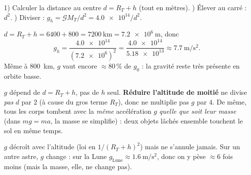 \documentclass[11pt,a4paper]{article}
\begin{document}
\begin{methode}
1) Calculer la distance au centre $d=R_T+h$ (tout en mètres). ) Élever au carré : $d^2$. ) Diviser : $g_h=\mathcal{G}M_T/d^2=\num{4.0e14}/d^2$.
\end{methode}

\begin{exemplebox}[à $h=\qty{800}{\kilo\metre}$]
$d=R_T+h=6400+800=\qty{7200}{\kilo\metre}=\qty{7.2e6}{\metre}$, donc
\[
g_h=\frac{\num{4.0e14}}{(\num{7.2e6})^2}=\frac{\num{4.0e14}}{\num{5.18e13}}
\approx\qty{7.7}{\metre\per\second\squared}.
\]
Même à \qty{800}{\kilo\metre}, $g$ vaut encore $\approx 80\,\%$ de $g_0$ : la gravité
reste très présente en orbite basse.
\end{exemplebox}

\begin{piege}
$g$ dépend de $d=R_T+h$, pas de $h$ seul. \textbf{Réduire l'altitude de moitié} ne
divise \emph{pas} $d$ par $2$ (à cause du gros terme $R_T$), donc ne multiplie pas $g$
par $4$. De même, tous les corps tombent avec la \emph{même} accélération $g$
\emph{quelle que soit leur masse} (dans $mg=ma$, la masse se simplifie) : deux objets
lâchés ensemble touchent le sol en même temps.
\end{piege}

\begin{remarque}
$g$ décroît avec l'altitude (loi en $1/(R_T+h)^2$) mais ne s'annule jamais. Sur un
autre astre, $g$ change : sur la Lune $g_{\text{Lune}}\approx\qty{1.6}{\metre\per\second\squared}$,
donc on y pèse $\approx 6$ fois moins (mais la masse, elle, ne change pas).
\end{remarque}
\end{document}

